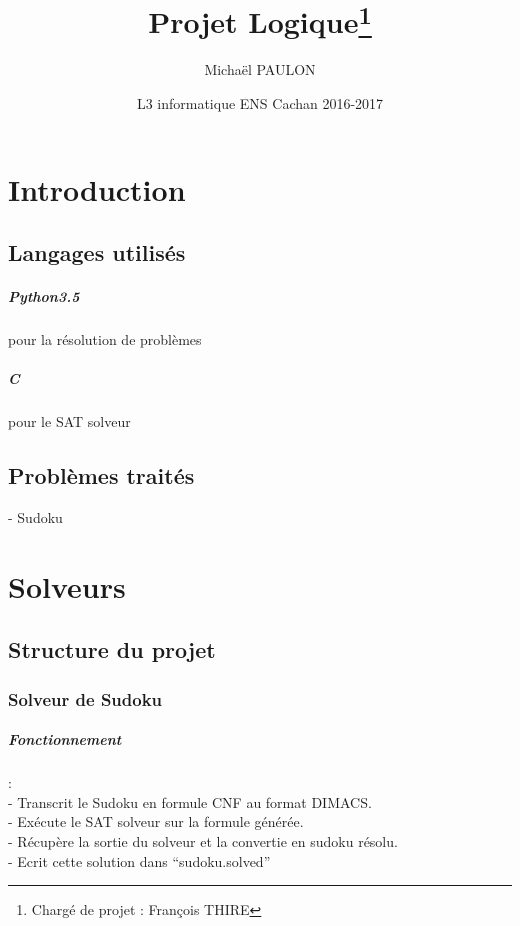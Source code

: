\documentclass{report}
\title{Projet Logique\thanks{Chargé de projet : François THIRE}}
\author{Michaël PAULON}
\date{L3 informatique ENS Cachan 2016-2017}
\begin{document}
\maketitle
\tableofcontents

\chapter{Introduction}

\section{Langages utilisés}

\paragraph{Python3.5} pour la résolution de problèmes

\paragraph{C} pour le SAT solveur

\section{Problèmes traités}
- Sudoku

\chapter{Solveurs}

\section{Structure du projet}

\subsection{Solveur de Sudoku}

\paragraph{Fonctionnement}:\\
- Transcrit le Sudoku en formule CNF au format DIMACS.\\
- Exécute le SAT solveur sur la formule générée.\\
- Récupère la sortie du solveur et la convertie en sudoku résolu.\\
- Ecrit cette solution dans ``sudoku.solved''
\end{document}
